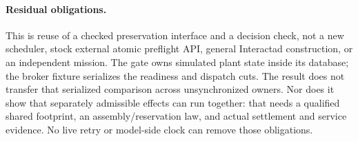 \documentclass{article}
\begin{document}
\paragraph{Residual obligations.}
This is reuse of a checked preservation interface and a decision
check, not a new scheduler, stock external atomic preflight API,
general Interactad construction, or an independent mission. The
gate owns simulated plant state inside its database; the broker
fixture serializes the readiness and dispatch cuts. The result
does not transfer that serialized comparison across unsynchronized
owners. Nor does it show that separately admissible effects can
run together: that needs a qualified shared footprint, an
assembly/reservation law, and actual settlement and service
evidence. No live retry or model-side clock can remove those
obligations.
\end{document}

